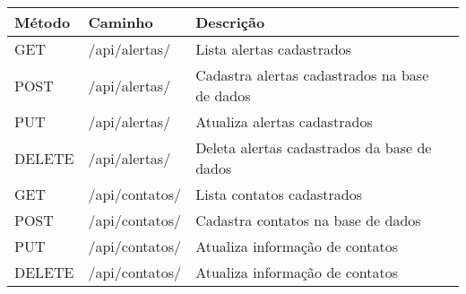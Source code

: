 \begin{tabular}{llll}
\toprule
Método & Caminho       & Descrição  \\
\midrule
GET    & /api/alertas/ & Lista alertas cadastrados \\
\midrule
POST   & /api/alertas/ & Cadastra alertas cadastrados na base de dados \\
\midrule
PUT    & /api/alertas/ & Atualiza alertas cadastrados \\
\midrule
DELETE & /api/alertas/ & Deleta alertas cadastrados da base de dados \\
\midrule
GET    & /api/contatos/ & Lista contatos cadastrados \\
\midrule
POST   & /api/contatos/ & Cadastra contatos na base de dados \\
\midrule
PUT    & /api/contatos/ & Atualiza informação de contatos \\
\midrule
DELETE & /api/contatos/ & Atualiza informação de contatos \\
\bottomrule
\end{tabular}
